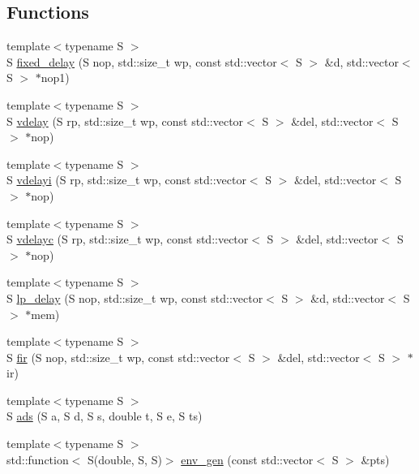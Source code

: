 \subsection*{Functions}
\begin{DoxyCompactItemize}
\item 
{\footnotesize template$<$typename S $>$ }\\S \hyperlink{namespace_aurora_afe9bb9ea0f50912f1fc95a2b15b135dd}{fixed\+\_\+delay} (S nop, std\+::size\+\_\+t wp, const std\+::vector$<$ S $>$ \&d, std\+::vector$<$ S $>$ $\ast$nop1)
\item 
{\footnotesize template$<$typename S $>$ }\\S \hyperlink{namespace_aurora_a384371636fb98d2845ddc7619acefd0b}{vdelay} (S rp, std\+::size\+\_\+t wp, const std\+::vector$<$ S $>$ \&del, std\+::vector$<$ S $>$ $\ast$nop)
\item 
{\footnotesize template$<$typename S $>$ }\\S \hyperlink{namespace_aurora_a6882049233d07537b7f0bdff7d703306}{vdelayi} (S rp, std\+::size\+\_\+t wp, const std\+::vector$<$ S $>$ \&del, std\+::vector$<$ S $>$ $\ast$nop)
\item 
{\footnotesize template$<$typename S $>$ }\\S \hyperlink{namespace_aurora_ae0b6df856278006b4fed4641f8ffe051}{vdelayc} (S rp, std\+::size\+\_\+t wp, const std\+::vector$<$ S $>$ \&del, std\+::vector$<$ S $>$ $\ast$nop)
\item 
{\footnotesize template$<$typename S $>$ }\\S \hyperlink{namespace_aurora_a3993d7b3f35ba929c5e59ba117252e1d}{lp\+\_\+delay} (S nop, std\+::size\+\_\+t wp, const std\+::vector$<$ S $>$ \&d, std\+::vector$<$ S $>$ $\ast$mem)
\item 
{\footnotesize template$<$typename S $>$ }\\S \hyperlink{namespace_aurora_a9b89513b24d0d89f0ecd400c899c78ce}{fir} (S nop, std\+::size\+\_\+t wp, const std\+::vector$<$ S $>$ \&del, std\+::vector$<$ S $>$ $\ast$ir)
\item 
{\footnotesize template$<$typename S $>$ }\\S \hyperlink{namespace_aurora_a787aaa0540c8f3be97e0ad55ba643b0a}{ads} (S a, S d, S s, double t, S e, S ts)
\item 
{\footnotesize template$<$typename S $>$ }\\std\+::function$<$ S(double, S, S)$>$ \hyperlink{namespace_aurora_aeac34405f4d58ec77eb9519844518255}{env\+\_\+gen} (const std\+::vector$<$ S $>$ \&pts)

\end{DoxyCompactItemize}
